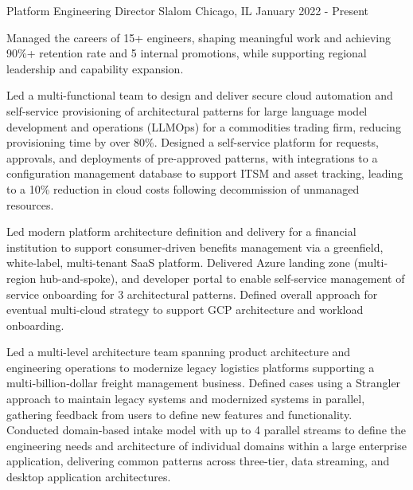 

\begin{cventries}

  \cventry
    {Platform Engineering Director} %
    {Slalom} %
    {Chicago, IL} %
    {January 2022 - Present} %
    {
      \begin{cvitems} %
        \item {Managed the careers of 15+ engineers, shaping meaningful work and achieving 90\%+ retention rate and 5 internal promotions, while supporting regional leadership and capability expansion.}
        \item {Led a multi-functional team to design and deliver secure cloud automation and self-service provisioning of architectural patterns for large language model development and operations (LLMOps) for a commodities trading firm, reducing provisioning time by over 80\%. Designed a self-service platform for requests, approvals, and deployments of pre-approved patterns, with integrations to a configuration management database to support ITSM and asset tracking, leading to a 10\% reduction in cloud costs following decommission of unmanaged resources.}
        \item {Led modern platform architecture definition and delivery for a financial institution to support consumer-driven benefits management via a greenfield, white-label, multi-tenant SaaS platform. Delivered Azure landing zone (multi-region hub-and-spoke), and developer portal to enable self-service management of service onboarding for 3 architectural patterns. Defined overall approach for eventual multi-cloud strategy to support GCP architecture and workload onboarding.}
        \item {Led a multi-level architecture team spanning product architecture and engineering operations to modernize legacy logistics platforms supporting a multi‑billion‑dollar freight management business. Defined cases using a Strangler approach to maintain legacy systems and modernized systems in parallel, gathering feedback from users to define new features and functionality. Conducted domain-based intake model with up to 4 parallel streams to define the engineering needs and architecture of individual domains within a large enterprise application, delivering common patterns across three-tier, data streaming, and desktop application architectures.}
      \end{cvitems}
    }


\end{cventries}
